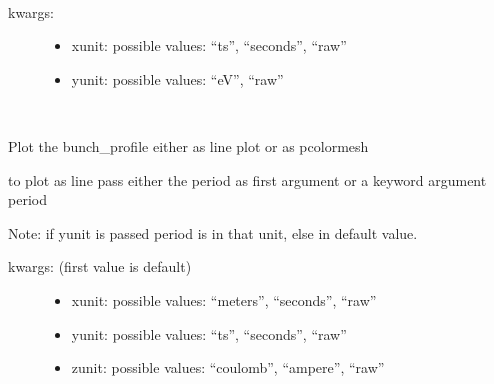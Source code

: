 \documentclass[letterpaper,10pt,openany,oneside,english]{sphinxmanual}
\begin{document}
\begin{fulllineitems}
\begin{fulllineitems}
\end{fulllineitems}


\begin{fulllineitems}
\label{\detokenize{plots:plots.SimplePlotter.energy_spread}}~\begin{description}
\item[{kwargs:  }] \leavevmode\begin{itemize}
\item {} 
xunit: possible values: “ts”, “seconds”, “raw”

\item {} 
yunit: possible values: “eV”, “raw”

\end{itemize}

\end{description}

\end{fulllineitems}


\begin{fulllineitems}
\label{\detokenize{plots:plots.SimplePlotter.bunch_profile}}~
\begin{DUlineblock}{0em}
\item[] Plot the bunch\_profile either as line plot or as pcolormesh  
\item[] to plot as line pass either the period as first argument or a keyword argument period  
\item[] Note: if yunit is passed period is in that unit, else in default value.  
\end{DUlineblock}
\begin{description}
\item[{kwargs: (first value is default)  }] \leavevmode\begin{itemize}
\item {} 
xunit: possible values: “meters”, “seconds”, “raw”

\item {} 
yunit: possible values: “ts”, “seconds”, “raw”

\item {} 
zunit: possible values: “coulomb”, “ampere”, “raw”


\end{itemize}
\end{description}
\end{fulllineitems}
\end{fulllineitems}
\end{document}
